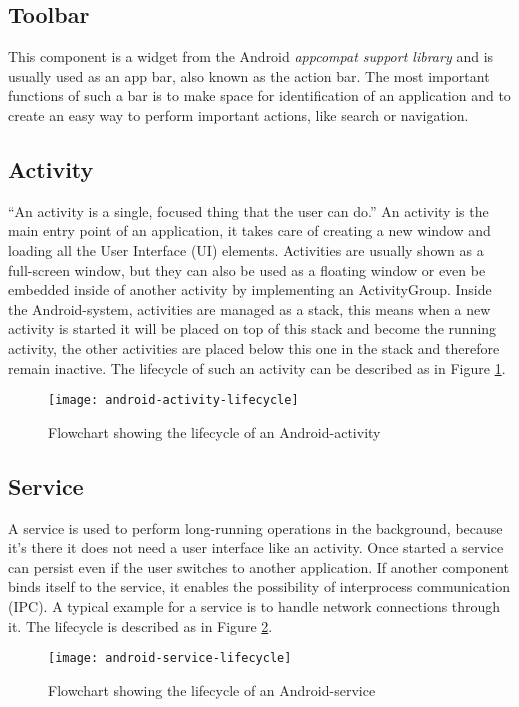 \subsection{Toolbar}
This component is a widget from the Android \emph{appcompat support library} and is usually used as an app bar, also known as the action bar. The most important functions of such a bar is to make space for identification of an application and to create an easy way to perform important actions, like search or navigation.

\subsection{Activity}
``An activity is a single, focused thing that the user can do.'' \cite{AndroidActivity} An activity is the main entry point of an application, it takes care of creating a new window and loading all the User Interface (UI) elements. Activities are usually shown as a full-screen window, but they can also be used as a floating window or even be embedded inside of another activity by implementing an ActivityGroup. Inside the Android-system, activities are managed as a stack, this means when a new activity is started it will be placed on top of this stack and become the running activity, the other activities are placed below this one in the stack and therefore remain inactive. The lifecycle of such an activity can be described as in Figure \ref{fig:activitylifecycle}.

\begin{figure}[H]
	\centering
	\texttt{[image: android-activity-lifecycle]}
	\caption{Flowchart showing the lifecycle of an Android-activity}
	\label{fig:activitylifecycle}
\end{figure}

\subsection{Service}
A service is used to perform long-running operations in the background, because it's there it does not need a user interface like an activity. Once started a service can persist even if the user switches to another application. If another component binds itself to the service, it enables the possibility of interprocess communication (IPC). A typical example for a service is to handle network connections through it. The lifecycle is described as in Figure \ref{fig:servicelifecycle}.

\begin{figure}[H]
	\centering
	\texttt{[image: android-service-lifecycle]}
	\caption{Flowchart showing the lifecycle of an Android-service}
	\label{fig:servicelifecycle}
\end{figure}

